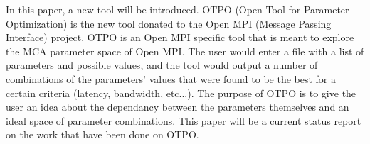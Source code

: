 In this paper, a new tool will be introduced. OTPO (Open Tool for Parameter
Optimization) is the new tool donated to the Open MPI (Message Passing
Interface) project. OTPO is an Open MPI specific tool that is meant to explore
the MCA parameter space of Open MPI. The user would enter a file with a list
of parameters and possible values, and the tool would output a number of
combinations of the parameters' values that were found to be the best for a
certain criteria (latency, bandwidth, etc...). The purpose of OTPO is to give the
user an idea about the dependancy between the parameters themselves and an
ideal space of parameter combinations. This paper will be a current status
report on the work that have been done on OTPO.
